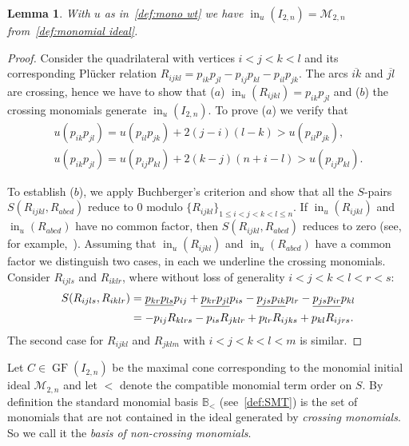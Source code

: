 \documentclass[10pt,a4paper]{amsart}
\newcommand{\thlabel}[1]{\label{#1}}
\newcommand{\thref}[1]{\ref{#1}}
\newtheorem{Lemma}[Theorem]{Lemma}
\numberwithin{equation}{section}
\DeclareMathOperator{\init}{in}
\DeclareMathOperator{\GF}{GF}
\begin{document}
\begin{Lemma}\thlabel{lem: mono ideal}
With $u$ as in~\thref{def:mono wt} we have $\init_u(I_{2,n})=\mathcal M_{2,n}$
from~\thref{def:monomial ideal}.
\end{Lemma}
\begin{proof}
Consider the quadrilateral with vertices $i<j<k<l$ and its corresponding Pl\"ucker relation $R_{ijkl}=p_{ik}p_{jl}-p_{ij}p_{kl}-p_{il}p_{jk}$.
The arcs $\overline{ik}$ and $\overline{jl}$ are crossing, hence we have to show that ($a$) $\init_u(R_{ijkl})=p_{ik}p_{jl}$ and ($b$) the crossing monomials generate $\init_u(I_{2,n})$.
To prove ($a$) we verify that
\begin{gather*}
u(p_{ik}p_{jl}) = u(p_{il}p_{jk}) +2(j-i)(l-k) > u(p_{il}p_{jk}),
\\
u(p_{ik}p_{jl}) = u(p_{ij}p_{kl})+2(k-j)(n+i-l)>u(p_{ij}p_{kl}).
\end{gather*}


To establish ($b$), we apply Buchberger's criterion and show that all the $S$-pairs $S(R_{ijkl},R_{abcd})$ reduce to $0$ modulo $\{R_{ijkl}\}_{ 1\le i<j<k<l\le n}$.
If $\init_u(R_{ijkl})$ and $\init_u(R_{abcd})$ have no common factor, then $S(R_{ijkl},R_{abcd})$ reduces to zero (see, for example,~\cite[Lemma~2.3.1]{herzog2011monomial}).
Assuming that $\init_u(R_{ijkl})$ and $\init_u(R_{abcd})$ have a common factor we distinguish two cases, in each we underline the crossing monomials.
Consider $R_{ijls}$ and $R_{iklr}$, where without loss of generality $i<j<k<l<r<s$:
\begin{gather*}\begin{split}
 & S(R_{ijls},R_{iklr})
 = \underline{p_{kr}p_{ls}}p_{ij} + \underline{p_{kr}p_{jl}}p_{is} - \underline{p_{js}p_{ik}}p_{lr} - \underline{p_{js}p_{ir}}p_{kl}
 \\
& \hphantom{S(R_{ijls},R_{iklr})}{} = -p_{ij} R_{klrs}- p_{is} R_{jklr}+ p_{lr} R_{ijks}+ p_{kl}R_{ijrs}.
\end{split}
 \end{gather*}
The second case for $R_{ijkl}$ and $R_{jklm}$ with $i<j<k<l<m$ is similar.
\end{proof}

Let $C\in \GF(I_{2,n})$ be the maximal cone corresponding to the monomial initial ideal $\mathcal M_{2,n}$ and let $<$ denote the compatible monomial term order on $S$. %
By definition the standard monomial basis $\mathbb B_<$ (see~\thref{def:SMT}) is the set of monomials that are not contained in the ideal generated by \emph{crossing monomials}.
So we call it the {\it basis of non-crossing monomials}.
\end{document}
